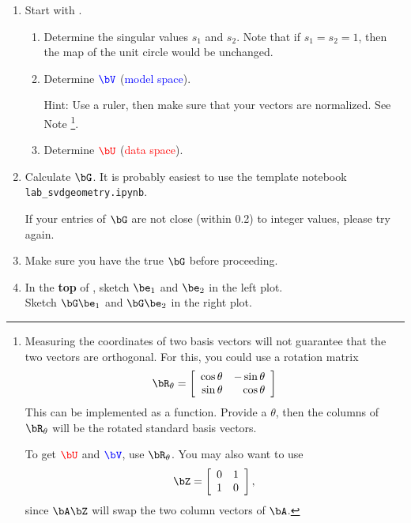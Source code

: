 \documentclass[11pt,titlepage,fleqn]{article}
\newcommand{\tfile}{{\tt lab\_svdgeometry.ipynb}}
\begin{document}
\begin{enumerate}

\item Start with .
%
\begin{enumerate}
\item Determine the singular values $s_1$ and $s_2$. Note that if $s_1 = s_2 = 1$, then the map of the unit circle would be unchanged.

\item Determine $\Vcolor$ (\textcolor{blue}{model space}).

Hint: Use a ruler, then make sure that your vectors are normalized. See Note \footnote{
Measuring the coordinates of two basis vectors will not guarantee that the two vectors are orthogonal. For this, you could use a rotation matrix
%
\begin{equation}
\bR_\theta = \left[
\begin{array}{rr}
\cos\theta & -\sin\theta \\ 
\sin\theta & \cos\theta
\end{array}
\right]
\end{equation}
%
This can be implemented as a function. Provide a $\theta$, then the columns of $\bR_\theta$ will be the rotated standard basis vectors.

To get $\Ucolor$ and $\Vcolor$, use $\bR_\theta$. You may also want to use
%
\begin{equation}
\bZ = \left[
\begin{array}{rr}
0 & 1 \\ 
1 & 0
\end{array}
\right],
\end{equation}
%
since $\bA\bZ$ will swap the two column vectors of $\bA$.
}.

\item Determine $\Ucolor$ (\textcolor{red}{data space}).

\end{enumerate}

\item Calculate $\bG$. It is probably easiest to use the template notebook \tfile.

If your entries of $\bG$ are not close (within 0.2) to integer values, please try again.

\item Make sure you have the true $\bG$ before proceeding.

\item In the {\bf top} of , sketch $\be_1$ and $\be_2$ in the left plot. \\
Sketch $\bG\be_1$ and $\bG\be_2$ in the right plot.


\end{enumerate}
\end{document}
